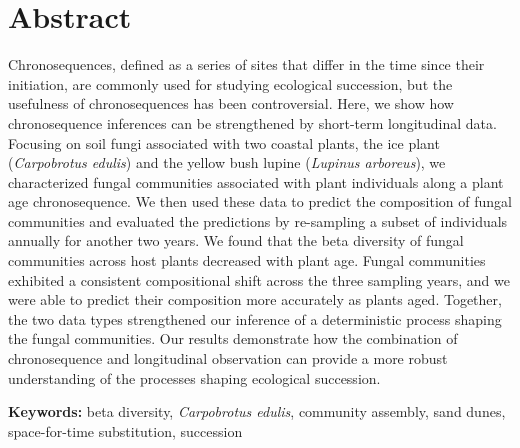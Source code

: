 \section{Abstract}
Chronosequences, defined as a series of sites that differ in the time since their initiation, are commonly used for studying ecological succession, but the usefulness of chronosequences has been controversial. Here, we show how chronosequence inferences can be strengthened by short-term longitudinal data.
Focusing on soil fungi associated with two coastal plants, the ice plant (\textit{Carpobrotus edulis}) and the yellow bush lupine (\textit{Lupinus arboreus}), we characterized fungal communities associated with plant individuals along a plant age chronosequence. 
We then used these data to predict the composition of fungal communities and evaluated the predictions by re-sampling a subset of individuals annually for another two years.
We found that the beta diversity of fungal communities across host plants decreased with plant age. Fungal communities exhibited a consistent compositional shift across the three sampling years, and we were able to predict their composition more accurately as plants aged. Together, the two data types strengthened our inference of a deterministic process shaping the fungal communities. Our results demonstrate how the combination of chronosequence and longitudinal observation can provide a more robust understanding of the processes shaping ecological succession.
\medskip


\noindent \textbf{Keywords:} beta diversity, \textit{Carpobrotus edulis}, community assembly, sand dunes, space-for-time substitution, succession



